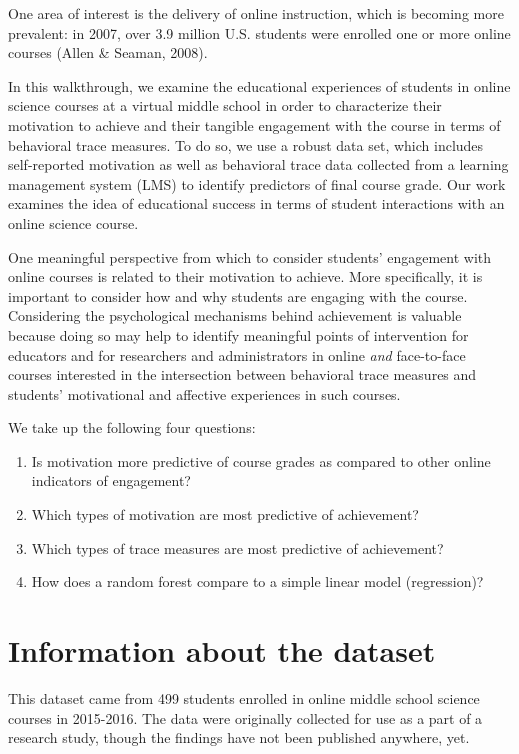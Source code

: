 \documentclass[]{book}
\providecommand{\tightlist}{%
  \setlength{\itemsep}{0pt}\setlength{\parskip}{0pt}}
\begin{document}
One area of interest is the delivery of online instruction, which is
becoming more prevalent: in 2007, over 3.9 million U.S. students were
enrolled one or more online courses (Allen \& Seaman, 2008).

In this walkthrough, we examine the educational experiences of students
in online science courses at a virtual middle school in order to
characterize their motivation to achieve and their tangible engagement
with the course in terms of behavioral trace measures. To do so, we use
a robust data set, which includes self-reported motivation as well as
behavioral trace data collected from a learning management system (LMS)
to identify predictors of final course grade. Our work examines the idea
of educational success in terms of student interactions with an online
science course.

One meaningful perspective from which to consider students' engagement
with online courses is related to their motivation to achieve. More
specifically, it is important to consider how and why students are
engaging with the course. Considering the psychological mechanisms
behind achievement is valuable because doing so may help to identify
meaningful points of intervention for educators and for researchers and
administrators in online \emph{and} face-to-face courses interested in
the intersection between behavioral trace measures and students'
motivational and affective experiences in such courses.

We take up the following four questions:

\begin{enumerate}
\def\labelenumi{\arabic{enumi}.}
\tightlist
\item
  Is motivation more predictive of course grades as compared to other
  online indicators of engagement?
\item
  Which types of motivation are most predictive of achievement?
\item
  Which types of trace measures are most predictive of achievement?
\item
  How does a random forest compare to a simple linear model
  (regression)?
\end{enumerate}

\chapter{Information about the
dataset}\label{information-about-the-dataset}

This dataset came from 499 students enrolled in online middle school
science courses in 2015-2016. The data were originally collected for use
as a part of a research study, though the findings have not been
published anywhere, yet.
\end{document}
